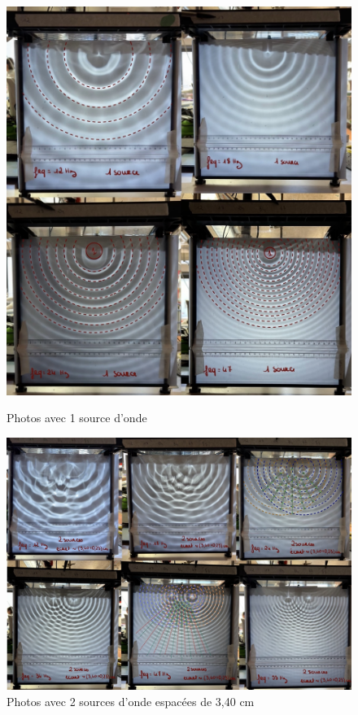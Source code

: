 \documentclass{report}
\begin{document}
\begin{figure}[H]
\centering
\begin{minipage}{0.4\textwidth}
  \centering
  \includegraphics[scale=0.14]{S1.jpg}
  \caption{Photos avec 1 source d'onde}
  \label{fig:s1}
\end{minipage}\hfill
\begin{minipage}{0.5\textwidth}
  \centering
  \includegraphics[scale=0.14]{S2P.jpg}
  \caption{Photos avec 2 sources d'onde espacées de 3,40 cm}
  \label{fig:s2}
\end{minipage}
\end{figure}
\end{document}
